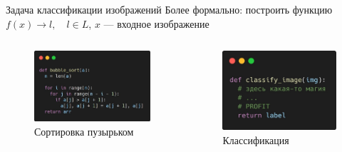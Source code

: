 \documentclass[aspectratio=169]{beamer}
\begin{document}
\begin{frame}{Задача классификации изображений}
    Более формально: построить функцию
    \( f(x) \rightarrow l, \quad l \in L \), \(x\) --- входное изображение
    \pause{}
    \vfill
    \begin{columns}
        \begin{column}{.49\linewidth}
            \begin{figure}
                \centering
                \includegraphics[width=\linewidth]{graphs/fig6_0.jpg}
                \caption*{Сортировка пузырьком}
            \end{figure}
        \end{column}
        \pause{}
        \begin{column}{.43\linewidth}
            \begin{figure}
                \centering
                \includegraphics[width=\linewidth]{graphs/fig6_1.jpg}
                \caption*{Классификация}
            \end{figure}
        \end{column}
    \end{columns}
\end{frame}
\end{document}
